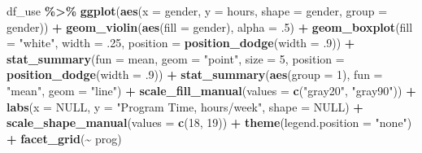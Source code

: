 \documentclass[
]{article}
\newenvironment{Shaded}{\begin{snugshade}}{\end{snugshade}}
\newcommand{\AttributeTok}[1]{\textcolor[rgb]{0.13,0.29,0.53}{#1}}
\newcommand{\ConstantTok}[1]{\textcolor[rgb]{0.56,0.35,0.01}{#1}}
\newcommand{\DecValTok}[1]{\textcolor[rgb]{0.00,0.00,0.81}{#1}}
\newcommand{\FunctionTok}[1]{\textcolor[rgb]{0.13,0.29,0.53}{\textbf{#1}}}
\newcommand{\NormalTok}[1]{#1}
\newcommand{\SpecialCharTok}[1]{\textcolor[rgb]{0.81,0.36,0.00}{\textbf{#1}}}
\newcommand{\StringTok}[1]{\textcolor[rgb]{0.31,0.60,0.02}{#1}}
\begin{document}
\begin{Shaded}
\begin{Highlighting}[]
\NormalTok{df\_use }\SpecialCharTok{\%\textgreater{}\%} 
  \FunctionTok{ggplot}\NormalTok{(}\FunctionTok{aes}\NormalTok{(}\AttributeTok{x =}\NormalTok{ gender,}
             \AttributeTok{y =}\NormalTok{ hours,}
             \AttributeTok{shape =}\NormalTok{ gender,}
             \AttributeTok{group =}\NormalTok{ gender)) }\SpecialCharTok{+} 
  \FunctionTok{geom\_violin}\NormalTok{(}\FunctionTok{aes}\NormalTok{(}\AttributeTok{fill =}\NormalTok{ gender),}
              \AttributeTok{alpha =}\NormalTok{ .}\DecValTok{5}\NormalTok{) }\SpecialCharTok{+}
  \FunctionTok{geom\_boxplot}\NormalTok{(}\AttributeTok{fill =} \StringTok{"white"}\NormalTok{,}
               \AttributeTok{width =}\NormalTok{ .}\DecValTok{25}\NormalTok{,}
               \AttributeTok{position =} \FunctionTok{position\_dodge}\NormalTok{(}\AttributeTok{width =}\NormalTok{ .}\DecValTok{9}\NormalTok{)) }\SpecialCharTok{+}
  \FunctionTok{stat\_summary}\NormalTok{(}\AttributeTok{fun =}\NormalTok{ mean,}
               \AttributeTok{geom =} \StringTok{"point"}\NormalTok{,}
               \AttributeTok{size =} \DecValTok{5}\NormalTok{,}
               \AttributeTok{position =} \FunctionTok{position\_dodge}\NormalTok{(}\AttributeTok{width =}\NormalTok{ .}\DecValTok{9}\NormalTok{)) }\SpecialCharTok{+}
  \FunctionTok{stat\_summary}\NormalTok{(}\FunctionTok{aes}\NormalTok{(}\AttributeTok{group =} \DecValTok{1}\NormalTok{),}
               \AttributeTok{fun =} \StringTok{"mean"}\NormalTok{,}
               \AttributeTok{geom =} \StringTok{"line"}\NormalTok{) }\SpecialCharTok{+}
  \FunctionTok{scale\_fill\_manual}\NormalTok{(}\AttributeTok{values =} \FunctionTok{c}\NormalTok{(}\StringTok{"gray20"}\NormalTok{, }\StringTok{"gray90"}\NormalTok{)) }\SpecialCharTok{+}
  \FunctionTok{labs}\NormalTok{(}\AttributeTok{x =} \ConstantTok{NULL}\NormalTok{,}
       \AttributeTok{y =} \StringTok{"Program Time, hours/week"}\NormalTok{,}
       \AttributeTok{shape =} \ConstantTok{NULL}\NormalTok{)  }\SpecialCharTok{+}
  \FunctionTok{scale\_shape\_manual}\NormalTok{(}\AttributeTok{values =} \FunctionTok{c}\NormalTok{(}\DecValTok{18}\NormalTok{, }\DecValTok{19}\NormalTok{)) }\SpecialCharTok{+}
  \FunctionTok{theme}\NormalTok{(}\AttributeTok{legend.position =} \StringTok{"none"}\NormalTok{) }\SpecialCharTok{+}
  \FunctionTok{facet\_grid}\NormalTok{(}\SpecialCharTok{\textasciitilde{}}\NormalTok{ prog)}
\end{Highlighting}
\end{Shaded}
\end{document}
